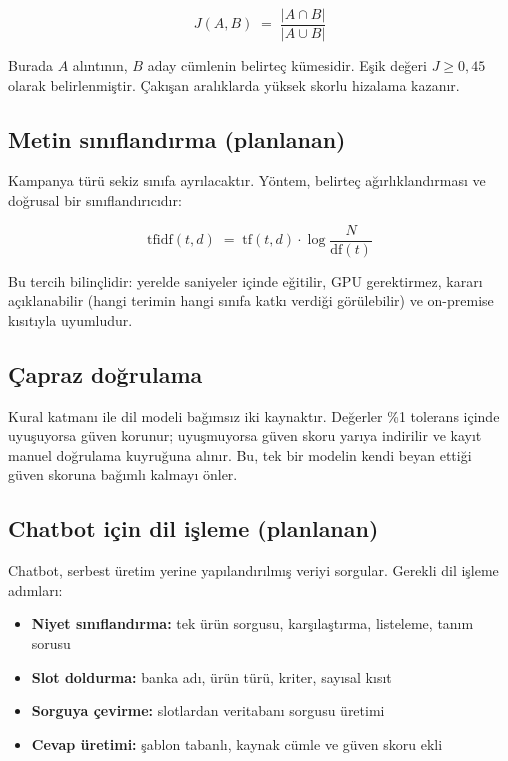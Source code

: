\documentclass[11pt,a4paper]{article}
\begin{document}
\[
J(A,B) \;=\; \frac{|A \cap B|}{|A \cup B|}
\]

Burada \(A\) alıntının, \(B\) aday cümlenin belirteç kümesidir. Eşik değeri
\(J \geq 0{,}45\) olarak belirlenmiştir. Çakışan aralıklarda yüksek skorlu
hizalama kazanır.

\subsection{Metin sınıflandırma (planlanan)}

Kampanya türü sekiz sınıfa ayrılacaktır. Yöntem, belirteç ağırlıklandırması
ve doğrusal bir sınıflandırıcıdır:

\[
\mathrm{tfidf}(t,d) \;=\; \mathrm{tf}(t,d)\cdot\log\frac{N}{\mathrm{df}(t)}
\]

Bu tercih bilinçlidir: yerelde saniyeler içinde eğitilir, GPU gerektirmez,
kararı açıklanabilir (hangi terimin hangi sınıfa katkı verdiği görülebilir)
ve on-premise kısıtıyla uyumludur.

\subsection{Çapraz doğrulama}

Kural katmanı ile dil modeli bağımsız iki kaynaktır. Değerler \%1 tolerans
içinde uyuşuyorsa güven korunur; uyuşmuyorsa güven skoru yarıya indirilir ve
kayıt manuel doğrulama kuyruğuna alınır. Bu, tek bir modelin kendi beyan
ettiği güven skoruna bağımlı kalmayı önler.

\subsection{Chatbot için dil işleme (planlanan)}

Chatbot, serbest üretim yerine yapılandırılmış veriyi sorgular. Gerekli dil
işleme adımları:

\begin{itemize}[leftmargin=1.2cm,itemsep=2pt]
  \item \textbf{Niyet sınıflandırma:} tek ürün sorgusu, karşılaştırma, listeleme, tanım sorusu
  \item \textbf{Slot doldurma:} banka adı, ürün türü, kriter, sayısal kısıt
  \item \textbf{Sorguya çevirme:} slotlardan veritabanı sorgusu üretimi
  \item \textbf{Cevap üretimi:} şablon tabanlı, kaynak cümle ve güven skoru ekli
\end{itemize}
\end{document}
